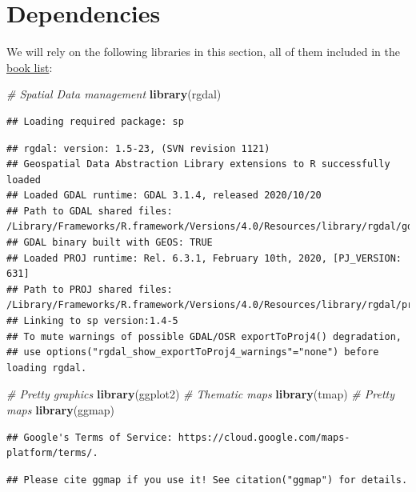 \documentclass[
]{book}
\newenvironment{Shaded}{\begin{snugshade}}{\end{snugshade}}
\newcommand{\CommentTok}[1]{\textcolor[rgb]{0.56,0.35,0.01}{\textit{#1}}}
\newcommand{\KeywordTok}[1]{\textcolor[rgb]{0.13,0.29,0.53}{\textbf{#1}}}
\newcommand{\NormalTok}[1]{#1}
\begin{document}
\hypertarget{dependencies-2}{%
\section{Dependencies}\label{dependencies-2}}

We will rely on the following libraries in this section, all of them included in the \protect\hyperlink{Dependency-list}{book list}:

\begin{Shaded}
\begin{Highlighting}[]
\CommentTok{# Spatial Data management}
\KeywordTok{library}\NormalTok{(rgdal)}
\end{Highlighting}
\end{Shaded}

\begin{verbatim}
## Loading required package: sp
\end{verbatim}

\begin{verbatim}
## rgdal: version: 1.5-23, (SVN revision 1121)
## Geospatial Data Abstraction Library extensions to R successfully loaded
## Loaded GDAL runtime: GDAL 3.1.4, released 2020/10/20
## Path to GDAL shared files: /Library/Frameworks/R.framework/Versions/4.0/Resources/library/rgdal/gdal
## GDAL binary built with GEOS: TRUE 
## Loaded PROJ runtime: Rel. 6.3.1, February 10th, 2020, [PJ_VERSION: 631]
## Path to PROJ shared files: /Library/Frameworks/R.framework/Versions/4.0/Resources/library/rgdal/proj
## Linking to sp version:1.4-5
## To mute warnings of possible GDAL/OSR exportToProj4() degradation,
## use options("rgdal_show_exportToProj4_warnings"="none") before loading rgdal.
\end{verbatim}

\begin{Shaded}
\begin{Highlighting}[]
\CommentTok{# Pretty graphics}
\KeywordTok{library}\NormalTok{(ggplot2)}
\CommentTok{# Thematic maps}
\KeywordTok{library}\NormalTok{(tmap)}
\CommentTok{# Pretty maps}
\KeywordTok{library}\NormalTok{(ggmap)}
\end{Highlighting}
\end{Shaded}

\begin{verbatim}
## Google's Terms of Service: https://cloud.google.com/maps-platform/terms/.
\end{verbatim}

\begin{verbatim}
## Please cite ggmap if you use it! See citation("ggmap") for details.
\end{verbatim}
\end{document}
